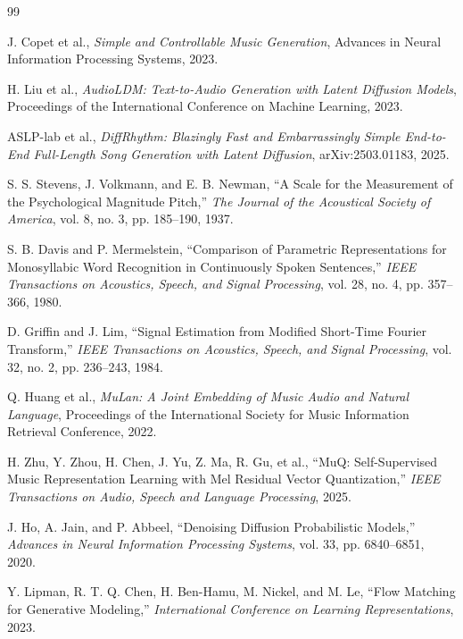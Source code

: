 \documentclass[a4paper,13pt,oneside]{report}
\begin{document}
\clearpage
{}
{}
\begin{thebibliography}{99}

J. Copet et al.,
\textit{Simple and Controllable Music Generation},
Advances in Neural Information Processing Systems, 2023.

H. Liu et al.,
\textit{AudioLDM: Text-to-Audio Generation with Latent Diffusion Models},
Proceedings of the International Conference on Machine Learning, 2023.

ASLP-lab et al.,
\textit{DiffRhythm: Blazingly Fast and Embarrassingly Simple End-to-End
Full-Length Song Generation with Latent Diffusion},
arXiv:2503.01183, 2025.


S. S. Stevens, J. Volkmann, and E. B. Newman,
``A Scale for the Measurement of the Psychological Magnitude Pitch,''
\textit{The Journal of the Acoustical Society of America}, vol. 8, no. 3,
pp. 185--190, 1937.

S. B. Davis and P. Mermelstein,
``Comparison of Parametric Representations for Monosyllabic Word Recognition in
Continuously Spoken Sentences,''
\textit{IEEE Transactions on Acoustics, Speech, and Signal Processing}, vol. 28,
no. 4, pp. 357--366, 1980.

D. Griffin and J. Lim,
``Signal Estimation from Modified Short-Time Fourier Transform,''
\textit{IEEE Transactions on Acoustics, Speech, and Signal Processing}, vol. 32,
no. 2, pp. 236--243, 1984.

Q. Huang et al.,
\textit{MuLan: A Joint Embedding of Music Audio and Natural Language},
Proceedings of the International Society for Music Information Retrieval
Conference, 2022.

H. Zhu, Y. Zhou, H. Chen, J. Yu, Z. Ma, R. Gu, et al.,
``MuQ: Self-Supervised Music Representation Learning with Mel Residual Vector
Quantization,''
\textit{IEEE Transactions on Audio, Speech and Language Processing}, 2025.

J. Ho, A. Jain, and P. Abbeel,
``Denoising Diffusion Probabilistic Models,''
\textit{Advances in Neural Information Processing Systems}, vol. 33,
pp. 6840--6851, 2020.

Y. Lipman, R. T. Q. Chen, H. Ben-Hamu, M. Nickel, and M. Le,
``Flow Matching for Generative Modeling,''
\textit{International Conference on Learning Representations}, 2023.


\end{thebibliography}
\end{document}
